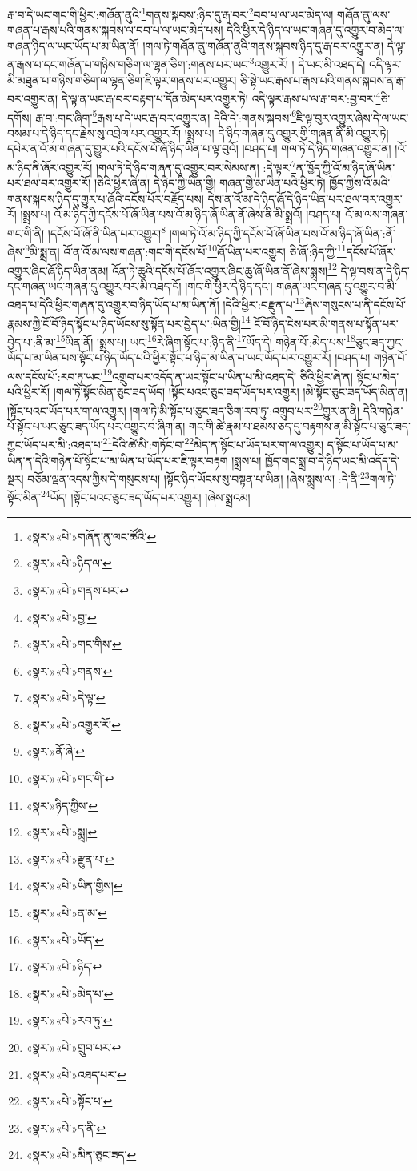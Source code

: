 རྒ་བ་དེ་ཡང་གང་གི་ཕྱིར་:གཞོན་ནུའི་\footnote{«སྣར་»«པེ་»གཞོན་ནུ་ལང་ཚོའི་}གནས་སྐབས་:ཉིད་དུ་རྒ་བར་\footnote{«སྣར་»«པེ་»ཉིད་ལ་}བབ་པ་ལ་ཡང་མེད་ལ། གཞོན་ནུ་ལས་གཞན་པ་རྒས་པའི་གནས་སྐབས་ལ་བབ་པ་ལ་ཡང་མེད་པས། དེའི་ཕྱིར་དེ་ཉིད་ལ་ཡང་གཞན་དུ་འགྱུར་བ་མེད་ལ་གཞན་ཉིད་ལ་ཡང་ཡོད་པ་མ་ཡིན་ནོ། །གལ་ཏེ་གཞོན་ནུ་གཞོན་ནུའི་གནས་སྐབས་ཉིད་དུ་རྒ་བར་འགྱུར་ན། དེ་ལྟ་ན་རྒས་པ་དང་གཞོན་པ་གཉིས་གཅིག་ལ་ལྷན་ཅིག་:གནས་པར་ཡང་\footnote{«སྣར་»«པེ་»གནས་པར་}འགྱུར་རོ། །
དེ་ཡང་མི་འཐད་དེ། འདི་ལྟར་མི་མཐུན་པ་གཉིས་གཅིག་ལ་ལྷན་ཅིག་ཇི་ལྟར་གནས་པར་འགྱུར། ཅི་སྟེ་ཡང་རྒས་པ་རྒས་པའི་གནས་སྐབས་ན་རྒ་བར་འགྱུར་ན། དེ་ལྟ་ན་ཡང་རྒ་བར་བརྟག་པ་དོན་མེད་པར་འགྱུར་ཏེ། འདི་ལྟར་རྒས་པ་ལ་རྒ་བར་:བྱ་བར་\footnote{«སྣར་»«པེ་»བྱ་}ཅི་དགོས། རྒ་བ་:གང་ཞིག་\footnote{«སྣར་»«པེ་»གང་གིས་}རྒས་པ་དེ་ཡང་རྒ་བར་འགྱུར་ན། དེའི་དེ་:གནས་སྐབས་\footnote{«སྣར་»«པེ་»གནས་}ཇི་ལྟ་བུར་འགྱུར་ཞེས་དེ་ལ་ཡང་བསམ་པ་དེ་ཉིད་དང་རྗེས་སུ་འབྲེལ་པར་འགྱུར་རོ། །སྨྲས་པ། དེ་ཉིད་གཞན་དུ་འགྱུར་གྱི་གཞན་ནི་མི་འགྱུར་ཏེ། དཔེར་ན་འོ་མ་གཞན་དུ་གྱུར་པའི་དངོས་པོ་ཞོ་ཉིད་ཡིན་པ་ལྟ་བུའོ། །བཤད་པ། གལ་ཏེ་དེ་ཉིད་གཞན་འགྱུར་ན། །འོ་མ་ཉིད་ནི་ཞོར་འགྱུར་རོ། །གལ་ཏེ་དེ་ཉིད་གཞན་དུ་འགྱུར་བར་སེམས་ན། :དེ་ལྟར་\footnote{«སྣར་»«པེ་»དེ་ལྟ་}ན་ཁྱོད་ཀྱི་འོ་མ་ཉིད་ཞོ་ཡིན་པར་ཐལ་བར་འགྱུར་རོ། །ཅིའི་ཕྱིར་ཞེ་ན། དེ་ཉིད་ཀྱི་ཡིན་གྱི། གཞན་གྱི་མ་ཡིན་པའི་ཕྱིར་ཏེ། ཁྱོད་ཀྱིས་འོ་མའི་གནས་སྐབས་ཉིད་དུ་གྱུར་པ་ཞོའི་དངོས་པོར་བརྗོད་པས། དེས་ན་འོ་མ་དེ་ཉིད་ཞོ་དེ་ཉིད་ཡིན་པར་ཐལ་བར་འགྱུར་རོ། །སྨྲས་པ། འོ་མ་ཉིད་ཀྱི་དངོས་པོ་ཞོ་ཡིན་པས་འོ་མ་ཉིད་ཞོ་ཡིན་ནོ་ཞེས་ནི་མི་སྨྲའོ། །བཤད་པ། འོ་མ་ལས་གཞན་གང་གི་ནི། །དངོས་པོ་ཞོ་ནི་ཡིན་པར་འགྱུར།\footnote{«སྣར་»«པེ་»འགྱུར་རོ།} །གལ་ཏེ་འོ་མ་ཉིད་ཀྱི་དངོས་པོ་ཞོ་ཡིན་པས་འོ་མ་ཉིད་ཞོ་ཡིན་:ནོ་ཞེས་\footnote{«སྣར་»ནོ་ཞེ་}མི་སྨྲ་ན། འོ་ན་འོ་མ་ལས་གཞན་:གང་གི་དངོས་པོ་\footnote{«སྣར་»«པེ་»གང་གི་}ཞོ་ཡིན་པར་འགྱུར། ཅི་ཞོ་:ཉིད་ཀྱི་\footnote{«སྣར་»ཉིད་ཀྱིས་}དངོས་པོ་ཞོར་འགྱུར་ཞིང་ཞོ་ཉིད་ཡིན་ནམ། འོན་ཏེ་ཆུའི་དངོས་པོ་ཞོར་འགྱུར་ཞིང་ཆུ་ཞོ་ཡིན་ནོ་ཞེས་སྨྲས།\footnote{«སྣར་»«པེ་»སྨྲ།} དེ་ལྟ་བས་ན་དེ་ཉིད་དང་གཞན་ཡང་གཞན་དུ་འགྱུར་བར་མི་འཐད་དོ། །གང་གི་ཕྱིར་དེ་ཉིད་དང་། གཞན་ཡང་གཞན་དུ་འགྱུར་བ་མི་འཐད་པ་དེའི་ཕྱིར་གཞན་དུ་འགྱུར་བ་ཉིད་ཡོད་པ་མ་ཡིན་ནོ། །དེའི་ཕྱིར་:བརྫུན་པ་\footnote{«སྣར་»«པེ་»རྫུན་པ་}ཞེས་གསུངས་པ་ནི་དངོས་པོ་རྣམས་ཀྱི་ངོ་བོ་ཉིད་སྟོང་པ་ཉིད་ཡོངས་སུ་སྟོན་པར་བྱེད་པ་:ཡིན་གྱི།\footnote{«སྣར་»«པེ་»ཡིན་གྱིས།} ངོ་བོ་ཉིད་ངེས་པར་མི་གནས་པ་སྟོན་པར་བྱེད་པ་:ནི་མ་\footnote{«སྣར་»«པེ་»ན་མ་}ཡིན་ནོ། །སྨྲས་པ། ཡང་\footnote{«སྣར་»«པེ་»ཡོད་}རེ་ཞིག་སྟོང་པ་:ཉིད་ནི་\footnote{«སྣར་»«པེ་»ཉིད་}ཡོད་དེ། གཉེན་པོ་:མེད་པས་\footnote{«སྣར་»«པེ་»མེད་པ་}ཅུང་ཟད་ཀྱང་ཡོད་པ་མ་ཡིན་པས་སྟོང་པ་ཉིད་ཡོད་པའི་ཕྱིར་སྟོང་པ་ཉིད་མ་ཡིན་པ་ཡང་ཡོད་པར་འགྱུར་རོ། །བཤད་པ། གཉེན་པོ་ལས་དངོས་པོ་:རབ་ཏུ་ཡང་\footnote{«སྣར་»«པེ་»རབ་ཏུ་}འགྲུབ་པར་འདོད་ན་ཡང་སྟོང་པ་ཡིན་པ་མི་འཐད་དེ། ཅིའི་ཕྱིར་ཞེ་ན། སྟོང་པ་མེད་པའི་ཕྱིར་རོ། །གལ་ཏེ་སྟོང་མིན་ཅུང་ཟད་ཡོད། །སྟོང་པའང་ཅུང་ཟད་ཡོད་པར་འགྱུར། །མི་སྟོང་ཅུང་ཟད་ཡོད་མིན་ན། །སྟོང་པའང་ཡོད་པར་ག་ལ་འགྱུར། །གལ་ཏེ་མི་སྟོང་པ་ཅུང་ཟད་ཅིག་རབ་ཏུ་:འགྲུབ་པར་\footnote{«སྣར་»«པེ་»གྲུབ་པར་}གྱུར་ན་ནི། དེའི་གཉེན་པོ་སྟོང་པ་ཡང་ཅུང་ཟད་ཡོད་པར་འགྱུར་བ་ཞིག་ན། གང་གི་ཚེ་རྣམ་པ་ཐམས་ཅད་དུ་བརྟགས་ན་མི་སྟོང་པ་ཅུང་ཟད་ཀྱང་ཡོད་པར་མི་:འཐད་པ་\footnote{«སྣར་»«པེ་»འཐད་པར་}དེའི་ཚེ་མི་:གཏོང་བ་\footnote{«སྣར་»«པེ་»སྟོང་པ་}མེད་ན་སྟོང་པ་ཡོད་པར་ག་ལ་འགྱུར། ད་སྟོང་པ་ཡོད་པ་མ་ཡིན་ན་དེའི་གཉེན་པོ་སྟོང་པ་མ་ཡིན་པ་ཡོད་པར་ཇི་ལྟར་བརྟག །སྨྲས་པ། ཁྱོད་གང་སྨྲ་བ་དེ་ཉིད་ཡང་མི་འདོད་དེ་སྔར། བཅོམ་ལྡན་འདས་ཀྱིས་དེ་གསུངས་པ། །སྟོང་ཉིད་ཡོངས་སུ་བསྟན་པ་ཡིན། །ཞེས་སྨྲས་ལ། :དེ་ནི་\footnote{«སྣར་»«པེ་»ད་ནི་}གལ་ཏེ་སྟོང་མིན་\footnote{«སྣར་»«པེ་»མིན་ཅུང་ཟད་}ཡོད། །སྟོང་པའང་ཅུང་ཟད་ཡོད་པར་འགྱུར། །ཞེས་སྨྲའམ། 
